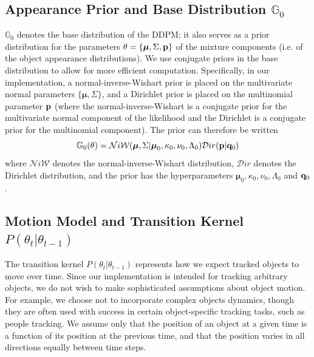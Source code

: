 \documentclass[twocolumn, final]{svjour3}
\begin{document}
\subsection{Appearance Prior and Base Distribution $\mathbb{G}_{0}$}
\label{sec:appearanceprior}

$\mathbb{G}_{0}$ denotes the base distribution of the DDPM; it also serves as a prior distribution for the parameters $\theta = \{ \boldsymbol{\mu}, \Sigma, \bold{p} \}$ of the mixture components (i.e. of the object appearance distributions). We use conjugate priors in the base distribution to allow for more efficient computation. Specifically, in our implementation, a normal-inverse-Wishart prior is placed on the multivariate normal parameters $\{ \boldsymbol{\mu}, \Sigma \}$, and a Dirichlet prior is placed on the multinomial parameter $\bold{p}$ (where the normal-inverse-Wishart is a conjugate prior for the multivariate normal component of the likelihood and the Dirichlet is a conjugate prior for the multinomial component). The prior can therefore be written
\begin{equation}
\label{basedistro}
\mathbb{G}_{0}(\theta) = \mathcal{N}i\mathcal{W}(\boldsymbol{\mu}, \Sigma | \boldsymbol{\mu}_{0}, \kappa_{0}, \nu_{0}, \Lambda_{0})  \mathcal{D}ir( \bold{p} | \bold{q}_{0})
\end{equation}
where $\mathcal{N}i\mathcal{W}$ denotes the normal-inverse-Wishart distribution, $\mathcal{D}ir$ denotes the Dirichlet distribution, and the prior has the hyperparameters $\boldsymbol{\mu}_{0}, \kappa_{0}, \nu_{0}, \Lambda_{0}$ and $\bold{q}_{0}$.


\subsection{Motion Model and Transition Kernel $P(\theta_{t} | \theta_{t-1})$}
\label{sec:motionmodel}

The transition kernel $P(\theta_{t} | \theta_{t-1})$ represents how we expect tracked objects to move over time. Since our implementation is intended for tracking arbitrary objects, we do not wish to make sophisticated assumptions about object motion. For example, we choose not to incorporate complex objects dynamics, though they are often used with success in certain object-specific tracking tasks, such as people tracking. We assume only that the position of an object at a given time is a function of its position at the previous time, and that the position varies in all directions equally between time steps.
\end{document}
